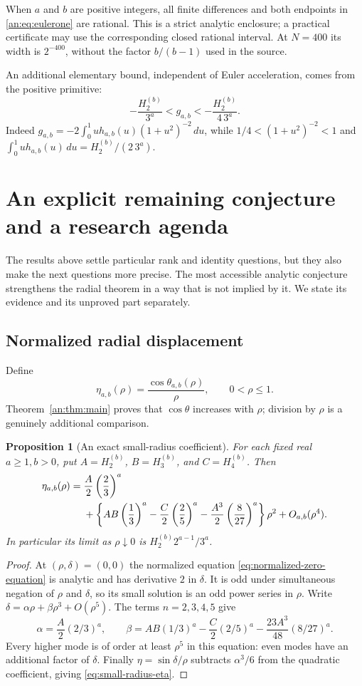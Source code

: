 \documentclass[11pt]{article}
\numberwithin{equation}{section}
\theoremstyle{plain}
\newtheorem{proposition}[theorem]{Proposition}
\theoremstyle{definition}
\theoremstyle{remark}
\begin{document}
When $a$ and $b$ are positive integers, all finite differences and
both endpoints in \eqref{an:eq:eulerone} are rational. This is a
strict analytic enclosure; a practical certificate may use the
corresponding closed rational interval. At $N=400$ its width is
$2^{-400}$, without the factor $b/(b-1)$ used in the source.

An additional elementary bound, independent of Euler acceleration,
comes from the positive primitive:
\[
 -\frac{H_2^{(b)}}{3^a}
 <g_{a,b}
 <-\frac{H_2^{(b)}}{4\,3^a}.
\]
Indeed
$g_{a,b}=-2\int_0^1u h_{a,b}(u)(1+u^2)^{-2}\,du$, while
$1/4<(1+u^2)^{-2}<1$ and
$\int_0^1u h_{a,b}(u)\,du=H_2^{(b)}/(2\,3^a)$.

\section{An explicit remaining conjecture and a research agenda}
\label{sec:research}

The results above settle particular rank and identity questions, but
they also make the next questions more precise. The most accessible
analytic conjecture strengthens the radial theorem in a way that is
not implied by it. We state its evidence and its unproved part separately.

\subsection{Normalized radial displacement}

Define
\[
 \eta_{a,b}(\rho)=\frac{\cos\theta_{a,b}(\rho)}{\rho},
 \qquad 0<\rho\le1.
\]
Theorem~\ref{an:thm:main} proves that $\cos\theta$ increases with
$\rho$; division by $\rho$ is a genuinely additional comparison.

\begin{proposition}[An exact small-radius coefficient]
\label{prop:small-radius}
For each fixed real $a\ge1,b>0$, put
$A=H_2^{(b)}$, $B=H_3^{(b)}$, and $C=H_4^{(b)}$. Then
\begin{align}\label{eq:small-radius-eta}
 \eta_{a,b}(\rho)
 ={}&\frac A2\left(\frac23\right)^a\notag\\
 &+\left\{
 AB\left(\frac13\right)^a
 -\frac C2\left(\frac25\right)^a
 -\frac{A^3}{2}\left(\frac8{27}\right)^a
 \right\}\rho^2+O_{a,b}(\rho^4).
\end{align}
In particular its limit as $\rho\downarrow0$ is
$H_2^{(b)}2^{a-1}/3^a$.
\end{proposition}
\begin{proof}
At $(\rho,\delta)=(0,0)$ the normalized equation
\eqref{eq:normalized-zero-equation} is analytic and has derivative
$2$ in $\delta$. It is odd under simultaneous negation of $\rho$
and $\delta$, so its small solution is an odd power series in $\rho$.
Write $\delta=\alpha\rho+\beta\rho^3+O(\rho^5)$.
The terms $n=2,3,4,5$ give
\[
 \alpha=\frac A2(2/3)^a,\qquad
 \beta=AB(1/3)^a-\frac C2(2/5)^a
              -\frac{23A^3}{48}(8/27)^a.
\]
Every higher mode is of order at least $\rho^5$ in this equation:
even modes have an additional factor of $\delta$.
Finally $\eta=\sin\delta/\rho$ subtracts $\alpha^3/6$ from the
quadratic coefficient, giving \eqref{eq:small-radius-eta}.
\end{proof}
\end{document}
